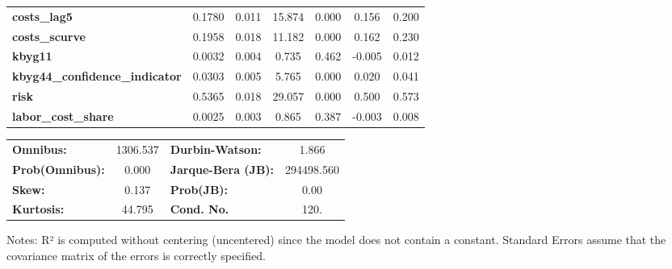 \begin{center}
\begin{tabular}{lcccccc}
\textbf{costs\_lag5}                   &       0.1780  &        0.011     &    15.874  &         0.000        &        0.156    &        0.200     \\
\textbf{costs\_scurve}                 &       0.1958  &        0.018     &    11.182  &         0.000        &        0.162    &        0.230     \\
\textbf{kbyg11}                        &       0.0032  &        0.004     &     0.735  &         0.462        &       -0.005    &        0.012     \\
\textbf{kbyg44\_confidence\_indicator} &       0.0303  &        0.005     &     5.765  &         0.000        &        0.020    &        0.041     \\
\textbf{risk}                          &       0.5365  &        0.018     &    29.057  &         0.000        &        0.500    &        0.573     \\
\textbf{labor\_cost\_share}            &       0.0025  &        0.003     &     0.865  &         0.387        &       -0.003    &        0.008     \\
\bottomrule
\end{tabular}
\begin{tabular}{lclc}
\textbf{Omnibus:}       & 1306.537 & \textbf{  Durbin-Watson:     } &     1.866   \\
\textbf{Prob(Omnibus):} &   0.000  & \textbf{  Jarque-Bera (JB):  } & 294498.560  \\
\textbf{Skew:}          &   0.137  & \textbf{  Prob(JB):          } &      0.00   \\
\textbf{Kurtosis:}      &  44.795  & \textbf{  Cond. No.          } &      120.   \\
\bottomrule
\end{tabular}
\end{center}

Notes: \newline
 [1] R² is computed without centering (uncentered) since the model does not contain a constant. \newline
 [2] Standard Errors assume that the covariance matrix of the errors is correctly specified.